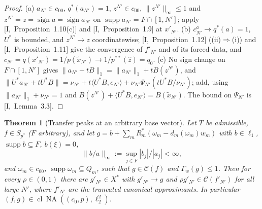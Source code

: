 \documentclass[10pt]{amsart}
\newtheorem{theorem}{Theorem}[section]
\theoremstyle{definition}
\theoremstyle{remark}
\newcommand{\NA}{\operatorname{NA}}
\newcommand{\supp}{\operatorname{supp}}
\newcommand{\sgn}{\operatorname{sign}}
\newcommand{\Cset}{\mathcal C}
\newcommand{\cl}{\operatorname{cl}}
\newcommand{\zh}{\hat z}
\newcommand{\ip}[2]{\langle #1,#2\rangle}
\begin{document}
\begin{proof}
(a) $a_{N'}\in c_{00}$, $q^*(a_{N'})=1$, $z^{N'}\in c_{00}$,
$\|z^{N'}\|_\infty\le1$ and $z^{N'}=z=\sgn a=\sgn a_{N'}$ on
$\supp a_{N'}=F\cap[1,N']$; apply [I,~Proposition~1.10(c)] and
[I,~Proposition~1.9] at $x'_{N'}$.  (b) $c^a_{N'}\to q^*(a)=1$, $U^*$ is
bounded, and $z^{N'}\to z$ coordinatewise; [I,~Proposition~1.12]
((ii)$\Rightarrow$(i)) and [I,~Proposition~1.11] give the convergence of
$f'_{N'}$ and of its forced data, and $c_{N'}=q(x'_{N'})=1/p(\tilde
x_{N'})\to1/p^{**}(\zh)=q_0$.  (c) No sign change on $F\cap[1,N']$ gives
$\|a_{N'}+tB\|_1=\|a_{N'}\|_1+tB(z^{N'})$, and
$\|U^*a_{N'}+tU^*B\|=\nu_{N'}+t\ip{U^*B}{e_{N'}}+\nu_{N'}\Psi_{N'}(tU^*B/
\nu_{N'})$; add, using $\|a_{N'}\|_1+\nu_{N'}=1$ and $B(z^{N'})+
\ip{U^*B}{e_{N'}}=B(\tilde x_{N'})$.  The bound on $\Psi_{N'}$ is
[I,~Lemma~3.3].
\end{proof}

\begin{theorem}[Transfer peaks at an arbitrary base vector]
\label{thm:II-transferinf}
Let $T$ be admissible, $f\in S_{p^*}$ \textup{(}$F$ arbitrary\textup{)},
and let $g=b+\sum_mR_m^*(\omega_m-d_m(\omega_m)w_m)$ with $b\in\ell_1$,
$\supp b\subseteq F$, $b(\xi)=0$,
\[
 \|b/a\|_\infty:=\sup_{j\in F}|b_j|/|a_j|<\infty,
\]
and $\omega_m\in c_{00}$, $\supp\omega_m\subseteq Q_m$, such that
$g\in\Cset(f)$ and $\Gamma_w(g)\le1$.  Then for every $\rho\in(0,1)$ there
are $g'_{N'}\in X^*$ with $g'_{N'}\to g$ and $\rho g'_{N'}\in
\Cset(f'_{N'})$ for all large $N'$, where $f'_{N'}$ are the truncated
canonical approximants.  In particular $(f,g)\in\cl\NA((c_0,p),\ell_2^2)$.
\end{theorem}
\end{document}
